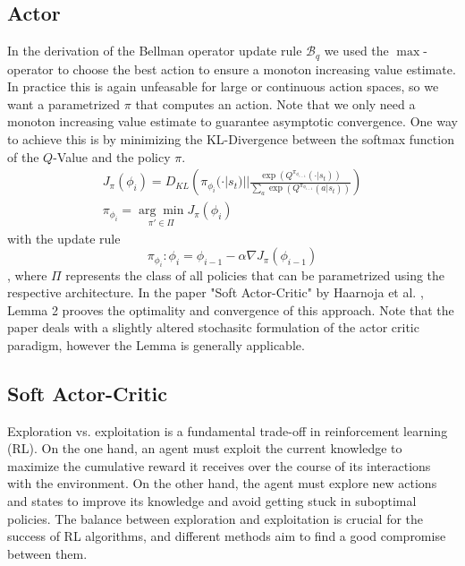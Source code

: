\subsection{Actor}
In the derivation of the Bellman operator update rule $\mathcal{B}_q$ we used the $\max$-operator to choose the best action to ensure a monoton increasing value estimate. In practice this is again unfeasable 
for large or continuous action spaces, so we want a parametrized $\pi$ that computes an action. Note that we only need a monoton increasing value estimate to guarantee asymptotic convergence. One way to 
achieve this is by minimizing the KL-Divergence between the softmax function of the $Q$-Value and the policy $\pi$. 
\begin{equation}
    \label{kl-obj}
    \begin{aligned}
        J_\pi(\phi_{i}) = D_{KL} \left( \pi_{\phi_{i}}(\cdot|s_t) || \frac{\exp(Q^{\pi_{\phi_{i-1}}}(\cdot|s_t))}{\underset{a}{\sum}  \exp(Q^{\pi_{\phi_{i-1}}}(a|s_t))} \right) \\
        \pi_{\phi_{i}} = \underset{\pi' \in \Pi}{\arg\min} J_\pi(\phi_{i})
    \end{aligned}
\end{equation}
with the update rule
\begin{equation}
    \pi_{\phi_{i}} : \phi_{i} = \phi_{i-1} - \alpha \nabla J_\pi(\phi_{i-1})
\end{equation}
, where $\Pi$ represents the class of all policies that can be parametrized using the respective architecture. In the paper "Soft Actor-Critic" by Haarnoja et al. \cite{haarnoja2018soft}, 
Lemma 2 prooves the optimality and convergence of this approach. Note that the paper deals with a slightly altered stochasitc formulation of the actor critic paradigm, however the Lemma is generally applicable.

\subsection{Soft Actor-Critic}
Exploration vs. exploitation is a fundamental trade-off in reinforcement learning (RL). On the one hand, an agent must exploit the current knowledge to maximize the cumulative reward it receives 
over the course of its interactions with the environment. On the other hand, the agent must explore new actions and states to improve its knowledge and avoid getting stuck in suboptimal policies. 
The balance between exploration and exploitation is crucial for the success of RL algorithms, and different methods aim to find a good compromise between them.

